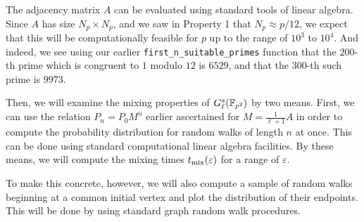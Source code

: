         The adjacency matrix $A$ can be evaluated using standard tools of linear algebra. Since $A$ has size $N_p \times N_p$, and we saw in Property 1 that $N_p \approx p/12$, we expect that this will be computationally feasible for $p$ up to the range of $10^3$ to $10^4$. And indeed, we see using our earlier \verb|first_n_suitable_primes| function that the $200$-th prime which is congruent to $1$ modulo $12$ is $6529$, and that the $300$-th such prime is $9973$.

        Then, we will examine the mixing properties of $G_\ell^s(\mathbb{F}_{p^2})$ by two means. First, we can use the relation $P_n = P_0 M^n$ earlier ascertained for $M = \frac{1}{\ell+1}A$ in order to compute the probability distribution for random walks of length $n$ at once. This can be done using standard computational linear algebra facilities. By these means, we will compute the mixing times $t_{\operatorname{mix}}(\varepsilon)$ for a range of $\varepsilon$.
        
        To make this concrete, however, we will also compute a sample of random walks beginning at a common initial vertex and plot the distribution of their endpoints. This will be done by using standard graph random walk procedures.
